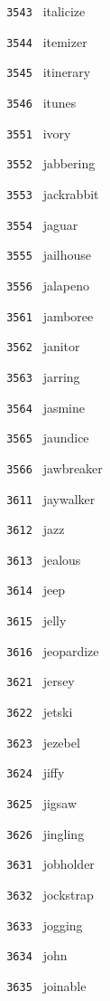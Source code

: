 \documentclass[11pt]{article}
\begin{document}
\begin{multicols}{6}
\noindent \texttt{ 3543 } italicize  \par
\noindent \texttt{ 3544 } itemizer  \par
\noindent \texttt{ 3545 } itinerary  \par
\noindent \texttt{ 3546 } itunes  \par
\noindent \texttt{ 3551 } ivory  \par
\noindent \texttt{ 3552 } jabbering  \par
\noindent \texttt{ 3553 } jackrabbit  \par
\noindent \texttt{ 3554 } jaguar  \par
\noindent \texttt{ 3555 } jailhouse  \par
\noindent \texttt{ 3556 } jalapeno  \par
\noindent \texttt{ 3561 } jamboree  \par
\noindent \texttt{ 3562 } janitor  \par
\noindent \texttt{ 3563 } jarring  \par
\noindent \texttt{ 3564 } jasmine  \par
\noindent \texttt{ 3565 } jaundice  \par
\noindent \texttt{ 3566 } jawbreaker  \par
\noindent \texttt{ 3611 } jaywalker  \par
\noindent \texttt{ 3612 } jazz  \par
\noindent \texttt{ 3613 } jealous  \par
\noindent \texttt{ 3614 } jeep  \par
\noindent \texttt{ 3615 } jelly  \par
\noindent \texttt{ 3616 } jeopardize  \par
\noindent \texttt{ 3621 } jersey  \par
\noindent \texttt{ 3622 } jetski  \par
\noindent \texttt{ 3623 } jezebel  \par
\noindent \texttt{ 3624 } jiffy  \par
\noindent \texttt{ 3625 } jigsaw  \par
\noindent \texttt{ 3626 } jingling  \par
\noindent \texttt{ 3631 } jobholder  \par
\noindent \texttt{ 3632 } jockstrap  \par
\noindent \texttt{ 3633 } jogging  \par
\noindent \texttt{ 3634 } john  \par
\noindent \texttt{ 3635 } joinable  \par

\end{multicols}
\end{document}
